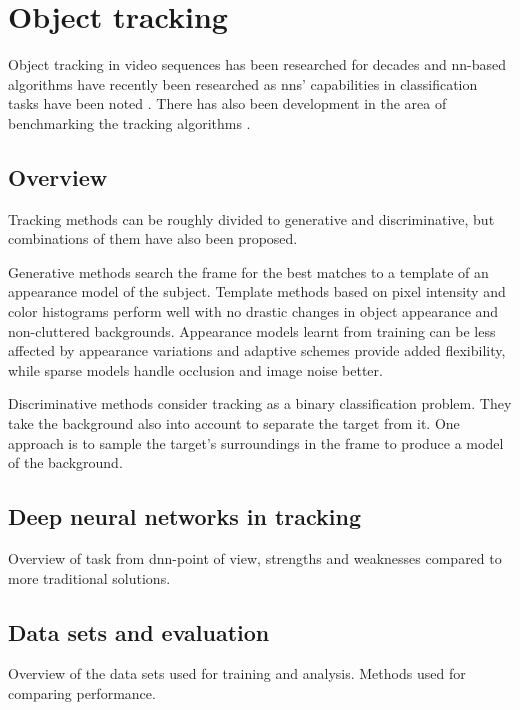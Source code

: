 \section{Object tracking}
Object tracking in video sequences has been researched for decades and \ac{nn}-based
algorithms have recently been researched  as \ac{nn}s'
capabilities in classification tasks have been noted .
There has also been development in the area of benchmarking the tracking algorithms
\cite{OT_BENCH}.

\subsection{Overview}
Tracking methods can be roughly divided to generative and discriminative, but combinations
of them have also been proposed.

Generative methods search the frame for the best matches
to a template of an appearance model of the subject. Template methods based on pixel
intensity and color histograms perform well with no drastic changes in object appearance
and non-cluttered backgrounds. Appearance models learnt from training can be less affected
by appearance variations and adaptive schemes provide added flexibility, while sparse
models handle occlusion and image noise better.~\cite{OBJECT_PLS} 

Discriminative methods consider tracking as a binary classification problem. They take
the background also into account to separate the target from it. One approach is to sample
the target's surroundings in the frame to produce a model of the background.

\subsection{Deep neural networks in tracking}
Overview of task from \ac{dnn}-point of view, strengths and weaknesses compared to
more traditional solutions.

\subsection{Data sets and evaluation}
Overview of the data sets used for training and analysis. Methods used for comparing
performance.
